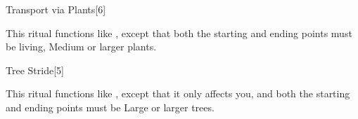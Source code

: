 \begin{spellsection}{Transport via Plants}[6]
    \begin{spellheader}
    \end{spellheader}
    \begin{spellcontent}
        \begin{spelltargetinginfo}
        \end{spelltargetinginfo}
        \begin{spelleffects}
            \spelleffect This ritual functions like , except that both the starting and ending points must be living, Medium or larger plants.
        \end{spelleffects}
    \end{spellcontent}
    \begin{spellfooter}
    \end{spellfooter}
    \begin{spellaugments}
    \end{spellaugments}
\end{spellsection}

\begin{spellsection}{Tree Stride}[5]
    \begin{spellheader}
    \end{spellheader}
    \begin{spellcontent}
        \begin{spelltargetinginfo}
        \end{spelltargetinginfo}
        \begin{spelleffects}
            \spellspecial This ritual functions like , except that it only affects you, and both the starting and ending points must be Large or larger trees.
        \end{spelleffects}
    \end{spellcontent}
    \begin{spellfooter}
    \end{spellfooter}
\end{spellsection}

